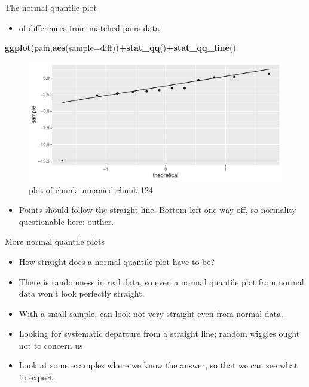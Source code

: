 \documentclass[ignorenonframetext,]{beamer}
\newenvironment{Shaded}{\begin{snugshade}}{\end{snugshade}}
\newcommand{\DataTypeTok}[1]{\textcolor[rgb]{0.13,0.29,0.53}{#1}}
\newcommand{\KeywordTok}[1]{\textcolor[rgb]{0.13,0.29,0.53}{\textbf{#1}}}
\newcommand{\NormalTok}[1]{#1}
\newcommand{\OperatorTok}[1]{\textcolor[rgb]{0.81,0.36,0.00}{\textbf{#1}}}
\providecommand{\tightlist}{%
  \setlength{\itemsep}{0pt}\setlength{\parskip}{0pt}}
\begin{document}
\begin{frame}[fragile]{The normal quantile plot}
\protect\hypertarget{the-normal-quantile-plot}{}

\begin{itemize}
\tightlist
\item
  of differences from matched pairs data
\end{itemize}

\begin{Shaded}
\begin{Highlighting}[]
\KeywordTok{ggplot}\NormalTok{(pain,}\KeywordTok{aes}\NormalTok{(}\DataTypeTok{sample=}\NormalTok{diff))}\OperatorTok{+}\KeywordTok{stat_qq}\NormalTok{()}\OperatorTok{+}\KeywordTok{stat_qq_line}\NormalTok{()}
\end{Highlighting}
\end{Shaded}

\begin{figure}
\centering
\includegraphics{figure/unnamed-chunk-124-1.pdf}
\caption{plot of chunk unnamed-chunk-124}
\end{figure}

\begin{itemize}
\tightlist
\item
  Points should follow the straight line. Bottom left one way off, so
  normality questionable here: outlier.
\end{itemize}

\end{frame}

\begin{frame}{More normal quantile plots}
\protect\hypertarget{more-normal-quantile-plots}{}

\begin{itemize}
\tightlist
\item
  How straight does a normal quantile plot have to be?
\item
  There is randomness in real data, so even a normal quantile plot from
  normal data won't look perfectly straight.
\item
  With a small sample, can look not very straight even from normal data.
\item
  Looking for systematic departure from a straight line; random wiggles
  ought not to concern us.
\item
  Look at some examples where we know the answer, so that we can see
  what to expect.
\end{itemize}

\end{frame}
\end{document}
